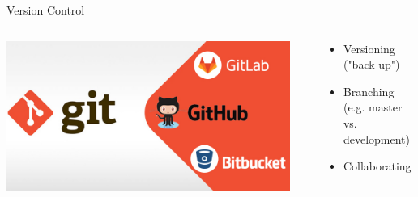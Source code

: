 \documentclass[aspectratio=169,10pt]{beamer}
\begin{document}
\begin{frame}[t,fragile]{Version Control}
\vspace{1cm}
    \begin{columns}
        \begin{column}{0.5\paperwidth}
            \begin{center}
                \includegraphics[width=\textwidth]{img/git-services.jpg}
            \end{center}
        \end{column}
        
        \begin{column}{0.02\paperwidth}
        \end{column}
        
        \begin{column}{0.48\paperwidth}
            \begin{itemize}
                \item Versioning ("back up")
                \item Branching (e.g. master vs. development)
                \item Collaborating
            \end{itemize}
        \end{column}
    \end{columns}
\end{frame}
\end{document}
